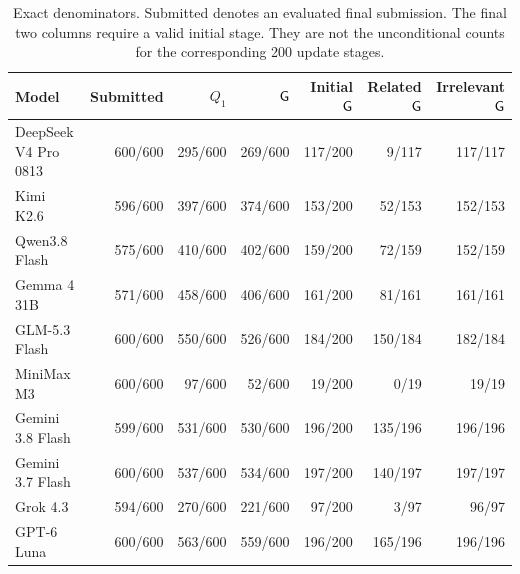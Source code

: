 \begin{table}[t]
\centering\small\setlength{\tabcolsep}{5pt}
\begin{tabular}{lrrrrrr}
\toprule
Model & Submitted & $Q_1$ & $\mathsf{G}$ & Initial $\mathsf{G}$ & Related $\mathsf{G}$ & Irrelevant $\mathsf{G}$ \\
\midrule
DeepSeek V4 Pro 0813 & 600/600 & 295/600 & 269/600 & 117/200 & 9/117 & 117/117 \\
Kimi K2.6 & 596/600 & 397/600 & 374/600 & 153/200 & 52/153 & 152/153 \\
Qwen3.8 Flash & 575/600 & 410/600 & 402/600 & 159/200 & 72/159 & 152/159 \\
Gemma 4 31B & 571/600 & 458/600 & 406/600 & 161/200 & 81/161 & 161/161 \\
GLM-5.3 Flash & 600/600 & 550/600 & 526/600 & 184/200 & 150/184 & 182/184 \\
MiniMax M3 & 600/600 & 97/600 & 52/600 & 19/200 & 0/19 & 19/19 \\
Gemini 3.8 Flash & 599/600 & 531/600 & 530/600 & 196/200 & 135/196 & 196/196 \\
Gemini 3.7 Flash & 600/600 & 537/600 & 534/600 & 197/200 & 140/197 & 197/197 \\
Grok 4.3 & 594/600 & 270/600 & 221/600 & 97/200 & 3/97 & 96/97 \\
GPT-6 Luna & 600/600 & 563/600 & 559/600 & 196/200 & 165/196 & 196/196 \\
\bottomrule\end{tabular}
\caption{Exact denominators. Submitted denotes an evaluated final submission. The final two columns require a valid initial stage. They are not the unconditional counts for the corresponding 200 update stages.}
\label{tab:counts}\end{table}